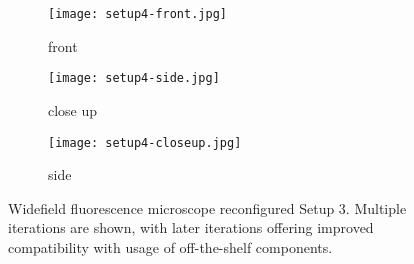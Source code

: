 \documentclass[../main.tex]{subfiles}
\begin{document}
\begin{figure}[htb]
	\begin{subfigure}[t]{0.32\textwidth}\centering
		\texttt{[image: setup4-front.jpg]}
        \caption{front}
	\end{subfigure}
	\hfill
	\begin{subfigure}[t]{0.32\textwidth}\centering
		\texttt{[image: setup4-side.jpg]}
        \caption{close up}
	\end{subfigure}
	\begin{subfigure}[t]{0.32\textwidth}\centering
		\texttt{[image: setup4-closeup.jpg]}
        \caption{side}
	\end{subfigure}
	\caption[Widefield fluorescence microscope reconfigured (Setup 3)]{
		Widefield fluorescence microscope reconfigured Setup 3.
		Multiple iterations are shown, with later iterations offering improved compatibility with usage of off-the-shelf components.}
	\label{fig:microscope-3}
\end{figure}


\clearpage
\end{document}
